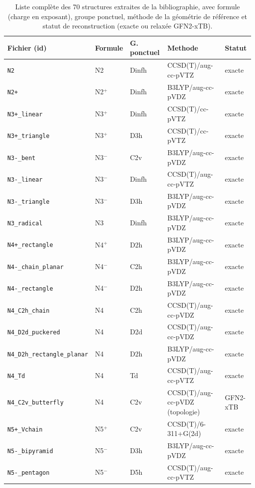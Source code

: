 \begin{longtable}{@{}p{4.4cm}p{1.3cm}p{1.2cm}p{4.1cm}p{1.9cm}@{}}
\caption{Liste compl\`ete des 70 structures extraites de la bibliographie, avec formule (charge en exposant), groupe ponctuel, m\'ethode de la g\'eom\'etrie de r\'ef\'erence et statut de reconstruction (exacte ou relax\'ee GFN2-xTB).}
\label{tab:structures}\\
\toprule
\textbf{Fichier (id)} & \textbf{Formule} & \textbf{G. ponctuel} & \textbf{Methode} & \textbf{Statut} \\
\midrule
\endhead
\texttt{N2} & N2 & Dinfh & CCSD(T)/aug-cc-pVTZ & exacte \\
\texttt{N2+} & N2$^{+}$ & Dinfh & B3LYP/aug-cc-pVDZ & exacte \\
\texttt{N3+\_linear} & N3$^{+}$ & Dinfh & CCSD(T)/cc-pVTZ & exacte \\
\texttt{N3+\_triangle} & N3$^{+}$ & D3h & CCSD(T)/cc-pVTZ & exacte \\
\texttt{N3-\_bent} & N3$^{-}$ & C2v & B3LYP/aug-cc-pVDZ & exacte \\
\texttt{N3-\_linear} & N3$^{-}$ & Dinfh & CCSD(T)/aug-cc-pVTZ & exacte \\
\texttt{N3-\_triangle} & N3$^{-}$ & D3h & B3LYP/aug-cc-pVDZ & exacte \\
\texttt{N3\_radical} & N3 & Dinfh & B3LYP/aug-cc-pVDZ & exacte \\
\texttt{N4+\_rectangle} & N4$^{+}$ & D2h & B3LYP/aug-cc-pVDZ & exacte \\
\texttt{N4-\_chain\_planar} & N4$^{-}$ & C2h & B3LYP/aug-cc-pVDZ & exacte \\
\texttt{N4-\_rectangle} & N4$^{-}$ & D2h & B3LYP/aug-cc-pVDZ & exacte \\
\texttt{N4\_C2h\_chain} & N4 & C2h & CCSD(T)/aug-cc-pVDZ & exacte \\
\texttt{N4\_D2d\_puckered} & N4 & D2d & CCSD(T)/aug-cc-pVDZ & exacte \\
\texttt{N4\_D2h\_rectangle\_planar} & N4 & D2h & B3LYP/aug-cc-pVDZ & exacte \\
\texttt{N4\_Td} & N4 & Td & CCSD(T)/aug-cc-pVTZ & exacte \\
\texttt{N4\_C2v\_butterfly} & N4 & C2v & CCSD(T)/aug-cc-pVDZ (topologie) & GFN2-xTB \\
\texttt{N5+\_Vchain} & N5$^{+}$ & C2v & CCSD(T)/6-311+G(2d) & exacte \\
\texttt{N5-\_bipyramid} & N5$^{-}$ & D3h & B3LYP/aug-cc-pVDZ & exacte \\
\texttt{N5-\_pentagon} & N5$^{-}$ & D5h & CCSD(T)/aug-cc-pVTZ & exacte \\

\end{longtable}
